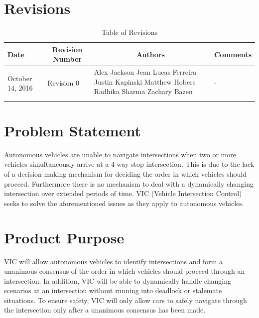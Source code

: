 \documentclass [12pt]{article}
\begin{document}

\tableofcontents
\listoftables

\pagebreak


\section{Revisions}
\begin{longtable}{| p{ } | p{ } | p{ } | p{ } |}

\hline 
\centering \textbf{Date} & 
\multicolumn{1}{c}{\textbf {Revision Number}} &
\multicolumn{1}{|c}{\textbf {Authors}} & 
\multicolumn{1}{|c|}{\textbf {Comments}} \\ \hline

\multirow{4}{*}{\centering October 14, 2016}  & 
\multirow{4}{*}{Revision 0}& 
{Alex Jackson \newline
		Jean Lucas Ferreira \newline
		Justin Kapinski\newline
		Matthew Hobers\newline
		Radhika Sharma\newline
		Zachary Bazen}
 &
\multirow{4}{*}{-} \\ 
\hline 

\caption{Table of Revisions} 
\end{longtable}

\pagebreak

\section{Problem Statement}
\indent\indent Autonomous vehicles are unable to navigate intersections when two or more vehicles simultaneously arrive at a 4 way stop intersection. This is due to the lack of a decision making mechanism for deciding the order in which vehicles should proceed.  Furthermore there is no mechanism to deal with a dynamically changing intersection over extended periods of time. VIC (Vehicle Intersection Control) seeks to solve the aforementioned issues as they apply to autonomous vehicles. 

\section{Product Purpose}
\indent\indent VIC will allow autonomous vehicles to identify intersections and form a unanimous consensus of the order in which vehicles should proceed through an intersection. In addition, VIC will be able to dynamically handle changing scenarios at an intersection without running into deadlock or stalemate situations. To ensure safety, VIC will only allow cars to safely navigate through the intersection only after a unanimous consensus has been made.
\end{document}
